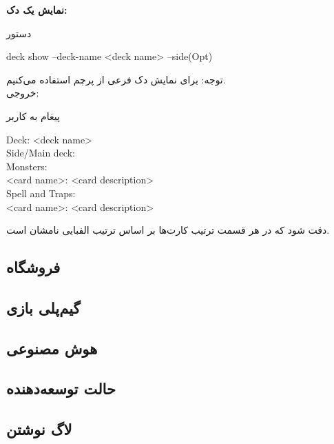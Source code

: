 \documentclass[]{article}
\begin{document}
\vspace{.5cm}
\textbf{نمایش یک دک:}
\begin{mybox}[colback=yellow]{دستور}
	\begin{latin}	
		deck show --deck-name <deck name> --side(Opt)
	\end{latin}
\end{mybox}
توجه: برای نمایش دک فرعی از پرچم  استفاده می‌کنیم.
\\
خروجی:
\begin{mybox}[colback=yellow]{پیغام به کاربر}
	\begin{latin}	
		Deck: <deck name> \\
		Side/Main deck: \\
		Monsters: \\
		<card name>: <card description> \\
		Spell and Traps: \\
		<card name>: <card description> \\
	\end{latin}
\end{mybox}
دقت شود که در هر قسمت ترتیب کارت‌ها بر اساس ترتیب الفبایی نامشان است.

\subsection*{{\titr فروشگاه}}

\subsection*{{\titr گیم‌پلی بازی}}


\subsection*{{\titr هوش مصنوعی}}

\subsection*{{\titr حالت توسعه‌دهنده}}


\subsection*{{\titr لاگ نوشتن}}
\end{document}
